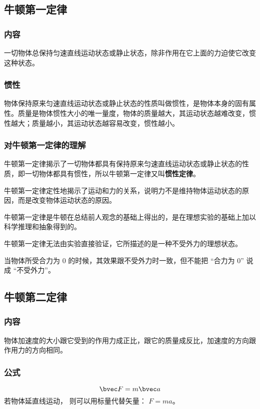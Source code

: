 

\subsection{牛顿第一定律}

\subsubsection{内容}
一切物体总保持匀速直线运动状态或静止状态，除非作用在它上面的力迫使它改变这种状态。

\subsubsection{惯性}
物体保持原来匀速直线运动状态或静止状态的性质叫做惯性，是物体本身的固有属性。质量是物体惯性大小的唯一量度，物体的质量越大，其运动状态越难改变，惯性越大；质量越小，其运动状态越容易改变，惯性越小。

\subsubsection{对牛顿第一定律的理解}
牛顿第一定律揭示了一切物体都具有保持原来匀速直线运动状态或静止状态的性质，即一切物体都具有惯性，所以牛顿第一定律又叫\textbf{惯性定律}。

牛顿第一定律定性地揭示了运动和力的关系，说明力不是维持物体运动状态的原因，而是改变物体运动状态的原因。

牛顿第一定律是牛顿在总结前人观念的基础上得出的，是在理想实验的基础上加以科学推理和抽象得到的。

牛顿第一定律无法由实验直接验证，它所描述的是一种不受外力的理想状态。

当物体所受合力为 $0$ 的时候，其效果跟不受外力时一致，但不能把 “合力为 $0$” 说成 “不受外力”。

\subsection{牛顿第二定律}
\subsubsection{内容}
物体加速度的大小跟它受到的作用力成正比，跟它的质量成反比，加速度的方向跟作用力的方向相同。

\subsubsection{公式}
\begin{equation}\label{eq_HSPM03_1}
\bvec F=m\bvec a
\end{equation}
若物体延直线运动， 则可以用标量代替矢量： $F=m a$。

